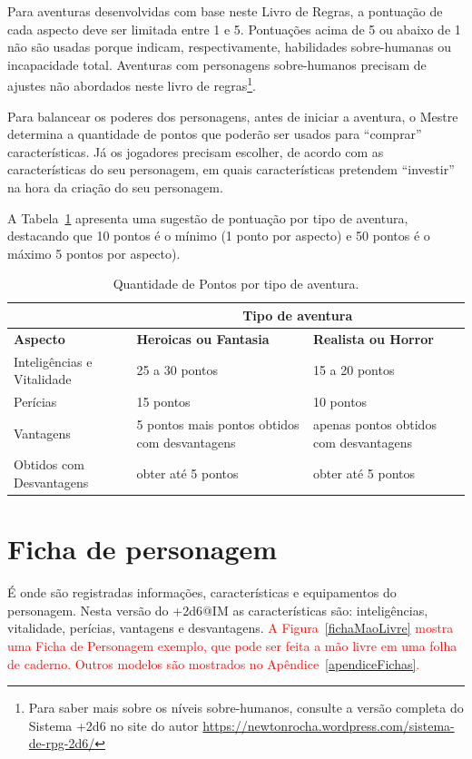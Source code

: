 Para aventuras desenvolvidas com base neste Livro de Regras, a pontuação de cada aspecto deve ser limitada entre 1 e 5. Pontuações acima de 5 ou abaixo de 1 não são usadas porque indicam, respectivamente, habilidades sobre-humanas ou incapacidade total. Aventuras com personagens sobre-humanos precisam de ajustes não abordados neste livro de regras\footnote{Para saber mais sobre os níveis sobre-humanos, consulte a versão completa do Sistema +2d6 no site do autor \url{https://newtonrocha.wordpress.com/sistema-de-rpg-2d6/}}.


Para balancear os poderes dos personagens, antes de iniciar a aventura, o Mestre determina a quantidade de pontos que poderão ser usados para ``comprar'' características. Já os jogadores precisam escolher, de acordo com as características do seu personagem, em quais características pretendem ``investir'' na hora da criação do seu personagem.

A Tabela~\ref{tblPtos} apresenta uma sugestão de pontuação por tipo de aventura, destacando que 10 pontos é o mínimo (1 ponto por aspecto) e 50 pontos é o máximo 5 pontos por aspecto). 

\begin{table}[htb]
	\centering\smaller
	\caption{Quantidade de Pontos por tipo de aventura.}
	\begin{tabularx}{\textwidth}{|X|X|X|}
		\hline
		&	\multicolumn{2}{c|}{\textbf{Tipo de aventura}} \\
		\hline
		\textbf{Aspecto}	&	\textbf{Heroicas ou Fantasia} &	\textbf{Realista ou Horror} \\
		\hline
		Inteligências e Vitalidade		& 25 a 30 pontos  	& 15 a 20 pontos	\\
		\hline
		Perícias		& 15 pontos  				& 10 pontos\\
		\hline
		Vantagens		& 5 pontos mais pontos obtidos com desvantagens 				& apenas pontos obtidos com desvantagens \\
		\hline
		Obtidos com Desvantagens	& obter até 5 pontos  	& obter até 5 pontos \\
		\hline
	\end{tabularx}
	\label{tblPtos}
\end{table}


\section{\label{sec:fichaPdj}Ficha de personagem}
É onde são registradas informações, características e equipamentos do personagem. Nesta versão do +2d6@IM as características são: inteligências, vitalidade, perícias, vantagens e desvantagens. \textcolor{red}{A Figura~\ref{fichaMaoLivre} mostra uma Ficha de Personagem exemplo, que pode ser feita a mão livre em uma folha de caderno. Outros modelos são mostrados no Apêndice~\ref{apendiceFichas}.}

